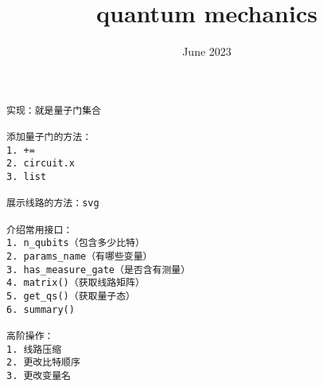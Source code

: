 \begin{lstlisting}
实现：就是量子门集合

添加量子门的方法：
1. +=
2. circuit.x
3. list

展示线路的方法：svg

介绍常用接口：
1. n_qubits（包含多少比特）
2. params_name（有哪些变量）
3. has_measure_gate（是否含有测量）
4. matrix()（获取线路矩阵）
5. get_qs()（获取量子态）
6. summary()

高阶操作：
1. 线路压缩
2. 更改比特顺序
3. 更改变量名
\end{lstlisting}

\documentclass{report}
\usepackage{graphicx} %
\usepackage{amsmath} %
\usepackage{braket} %
\usepackage{pythonhighlight} %
\usepackage{caption}
\usepackage{listings}
\usepackage{ctex}
\usepackage{makecell}
\graphicspath{{images/} }
\title{quantum mechanics}
\date{June 2023}

\section{Quantum circuit}
The quantum circuit can accomplish some useful tasks, it can change the states of the qubits. The quantum circuit is to be read from left-to-right. Each line in the circuit represents a \textit{wire} in the quantum circuit. This wire does not necessarily correspond to a physical wire; it may correspond instead to the passage of time, or perhaps to a physical particle. 

There are a few features allowed in classical circuits that are not usually present in quantum circuits. First of all, we do not allow 'loops', that is, feedback from one part of the quantum circuit to another. second, classical circuits allow wires to be 'joined' together. Third, the inverse operation is also not allowed in quantum circuits.

The quantum circuit has some important operations. First, it allows us to use control qubit to operator on the target qubit, if the control qubit is set 1 then the gate will be applied to the targer qubits. Another important operation is measurement, which we represent by a 'meter' symbol.  
 
\subsection{Quantum gate set}
Quantum gates (quantum logic gates) are the basic logical units of quantum circuit. Basic quantum gates commonly used are X gate, Y gate, Z gate, Hadamard gate (H gate), CNOT gate, and revolving gate RX gate, RY gate, and RZ gate. \\

